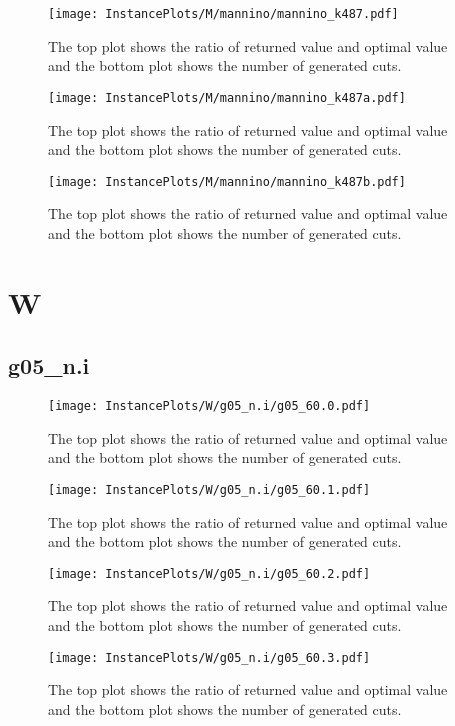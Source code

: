 \documentclass[10pt,a4paper]{article}
\begin{document}
\begin{figure}[H]
\texttt{[image: InstancePlots/M/mannino/mannino\_k487.pdf]}
\caption{The top plot shows the ratio of returned value and optimal value     and the bottom plot shows the number of generated cuts.}
\end{figure}

\begin{figure}[H]
\texttt{[image: InstancePlots/M/mannino/mannino\_k487a.pdf]}
\caption{The top plot shows the ratio of returned value and optimal value     and the bottom plot shows the number of generated cuts.}
\end{figure}

\begin{figure}[H]
\texttt{[image: InstancePlots/M/mannino/mannino\_k487b.pdf]}
\caption{The top plot shows the ratio of returned value and optimal value     and the bottom plot shows the number of generated cuts.}
\end{figure}

\section{W}
\subsection{g05\_n.i}
\begin{figure}[H]
\texttt{[image: InstancePlots/W/g05\_n.i/g05\_60.0.pdf]}
\caption{The top plot shows the ratio of returned value and optimal value     and the bottom plot shows the number of generated cuts.}
\end{figure}

\begin{figure}[H]
\texttt{[image: InstancePlots/W/g05\_n.i/g05\_60.1.pdf]}
\caption{The top plot shows the ratio of returned value and optimal value     and the bottom plot shows the number of generated cuts.}
\end{figure}

\begin{figure}[H]
\texttt{[image: InstancePlots/W/g05\_n.i/g05\_60.2.pdf]}
\caption{The top plot shows the ratio of returned value and optimal value     and the bottom plot shows the number of generated cuts.}
\end{figure}

\begin{figure}[H]
\texttt{[image: InstancePlots/W/g05\_n.i/g05\_60.3.pdf]}
\caption{The top plot shows the ratio of returned value and optimal value     and the bottom plot shows the number of generated cuts.}
\end{figure}
\end{document}
